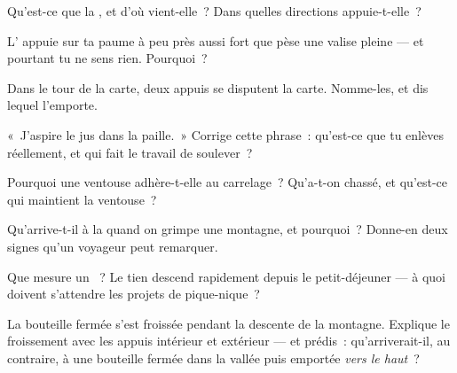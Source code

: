 \begin{exercise}[$\star$]\label{exo:g5:air-pressure-weather:2}
Qu'est-ce que la , et d'où vient-elle~? Dans
quelles directions appuie-t-elle~?
\end{exercise}

\begin{exercise}[$\star$]\label{exo:g5:air-pressure-weather:3}
L' appuie sur ta paume à peu près aussi fort que pèse une
valise pleine --- et pourtant tu ne sens rien. Pourquoi~?
\end{exercise}

\begin{exercise}[$\star$]\label{exo:g5:air-pressure-weather:4}
Dans le tour de la carte, deux appuis se disputent la carte. Nomme-les,
et dis lequel l'emporte.
\end{exercise}

\begin{exercise}[$\star$]\label{exo:g5:air-pressure-weather:5}
«~J'aspire le jus dans la paille.~» Corrige cette phrase~: qu'est-ce
que tu enlèves réellement, et qui fait le travail de soulever~?
\end{exercise}

\begin{exercise}[$\star$]\label{exo:g5:air-pressure-weather:6}
Pourquoi une ventouse adhère-t-elle au carrelage~? Qu'a-t-on chassé,
et qu'est-ce qui maintient la ventouse~?
\end{exercise}

\begin{exercise}[$\star$]\label{exo:g5:air-pressure-weather:7}
Qu'arrive-t-il à la  quand on grimpe une
montagne, et pourquoi~? Donne-en deux signes qu'un voyageur peut
remarquer.
\end{exercise}

\begin{exercise}[$\star$]\label{exo:g5:air-pressure-weather:8}
Que mesure un ~? Le tien descend rapidement depuis le
petit-déjeuner --- à quoi doivent s'attendre les projets de
pique-nique~?
\end{exercise}

\begin{exercise}[$\star\star$]\label{exo:g5:air-pressure-weather:9}
La bouteille fermée s'est froissée pendant la descente de la
montagne. Explique le froissement avec les appuis intérieur et
extérieur --- et prédis~: qu'arriverait-il, au contraire, à une
bouteille fermée dans la vallée puis emportée \emph{vers le haut}~?
\end{exercise}

